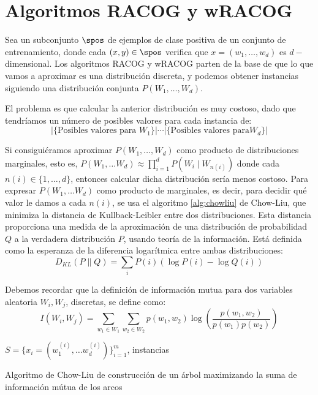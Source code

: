 \section{Algoritmos RACOG y wRACOG}
Sea un subconjunto $\spos$ de ejemplos de clase positiva de un conjunto de entrenamiento, donde cada $(x,y)\in \spos$ 
verifica que $x = (w_1, \ldots, w_d)$ es $d-$dimensional. Los algoritmos RACOG y wRACOG parten de la base de que lo que vamos
a aproximar es una distribución discreta, y podemos obtener instancias siguiendo una distribución 
conjunta $P(W_1, \ldots, W_d)$.

El problema es que calcular la anterior distribución es muy costoso, dado que tendríamos un número de posibles valores para 
cada instancia de:
\[
  |\{\textrm{Posibles valores para }W_1\}| \cdots |\{\textrm{Posibles valores para} W_d\}|
\]

Si consiguiéramos aproximar $P(W_1, \ldots, W_d)$ como producto de distribuciones marginales, esto es, 
$P(W_1, \ldots W_d) \approx \prod_{i=1}^d P(W_i \mid W_{n(i)})$ donde cada $n(i) \in \{1, \ldots, d\}$,
entonces calcular dicha distribución sería menos costoso. Para expresar $P(W_1, \ldots W_d)$ como producto de marginales,
es decir, para decidir qué valor le damos a cada $n(i)$, se usa el algoritmo \ref{alg:chowliu} de Chow-Liu,
que minimiza la distancia de Kullback-Leibler entre dos distribuciones. Esta distancia proporciona una medida de la 
aproximación de una distribución de probabilidad $Q$ a la verdadera distribución $P$, usando teoría de la información. 
Está definida como la esperanza de la diferencia logarítmica entre ambas distribuciones:
\[
  D_{KL}(P \parallel Q) = \sum_{i} P(i) \left(\log P(i) - \log Q(i)\right)
\]

Debemos recordar que la definición de información mutua para dos variables aleatoria $W_i, W_j$, discretas, 
se define como:
\[
  I(W_i, W_j) = \sum_{w_1\in W_1} \sum_{w_2\in W_2} p(w_1, w_2) \log\left(\frac{p(w_1,w_2)}{p(w_1) p(w_2)}\right)
\]

\begin{algorithm}[H]
\begin{algorithmic}[1]
 \REQUIRE $S = \{x_i=(w_1^{(i)}, \ldots w_d^{(i)})\}_{i=1}^m$, instancias
 \ENDFOR
\end{algorithmic}
\caption{Algoritmo de Chow-Liu de construcción de un árbol maximizando la suma de información
mútua de los arcos}
\label{alg:chowliu}
\end{algorithm}

